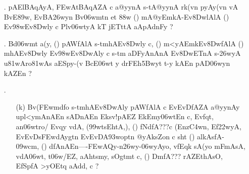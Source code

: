 \def\DevnagVersion{2.15}\documentclass{article}
\begin{document}
\begin{itemize}
\begin{itemize}
                \item[({\dn K}).]{\dn  Ev\398wEv\38DwAly\? pAWcmAnAnA\2 s\2-tAEtEr\3C4wAnA\2 EvqyAZA\2 \322w\?/ Evfoq\? s\2-tm\306wT\4, updFtA, \3FEw(y\2fA, t\?\2 t\?qA\2 EvqyAZA\2 pAWn{\rs -\re}\387wm\? rk(v\?n Env\?fAnFyA,{\rs ,\re} yTA{\rs ----\re}s\2-tkA\326wynAVkAl\2kAr{\rs -\re}fA-/AZA aAi`lsAEh(ypAWn\387wm\? Env\?fn BArtFygEZtAv\?{\qvb}d\?{\rs -\re}d\?s\0nDm\0fA{\rs ???\re}EdnA iEthAs-y c t\? t\? Evqy\? yTAs\2zy\2 Env\?fni(T\2 k\?cn cyE`t {\rs !\re} tA etA\2 cnA a\306wtr\?Z Ek\2 Bv\306wtA, \5, {\rs ?\re}}
              \end{itemize}
              
 \item[{\dn\dnnum \rn{15}}.]  {\dn pAElBAqAyA, \3FEwAtBAqAZA\2 c a@yynA\2 s\2-tA@yynA\2 rk(v\?n pyA\0y(v\?n vA BvE\389w, EvBA\326wyn Bv\306wmt\?n et\? \388w\? {\rs (\re}{\dn\dnnum {}}{\rs )\re} mA@yEmkA{\rs -\re}Ev\38DwlAlA {\rs (\re}{\dn \dnnum {}}{\rs )\re} Ev\398wEv\38Dwly\? c Plv\306wtyA kT\2 jETttA\2 aApAdnFy\? {\rs ?\re}} 
 
 \item[{\dn\dnnum \rn{16}}.] {\dn Bd\306wmt a(y{\rs ,\re} {\rs (\re}{\dn \dnnum {}}{\rs )\re} pAWfAlA s\2-tmhAEv\38Dwly\? c{\rs ,\re} {\rs (\re}{\dn \dnnum {}}{\rs )\re} m<yAEmkEv\38DwfAlA {\rs (\re}{\dn\dnnum {}}{\rs )\re} mhAEv\38Dwly\? Ev\398wEv\38DwAly\? c s\2-tm aDFyAnAnA\2 Ev\38DwET\0nA\2 s\2-\326wyA u\381wAro\381wAs aESpy-(v\2 BcE\306wt y drFEh\35Bwyt\?{\rs ,\re} t-y kAEn pAD\306wy\?n kAZ\0En {\rs ?\re} }
 
 \item[{\dn \dnnum \rn{17}}.]
 \begin{itemize}
 \item[({\dn k})]{\dn Bv(\3FEwmd\?fo s\2-tmhAEv\38DwAly\? pAWfAlA c EvEvDfAZA a@yynAy\0 upl<ymAnAEn sADnAEn Ek\2sv!pAEZ EkEm\2y\306wtEn c{\rs ,\re} Evf\?qt, an\306wtro/\? Evqy\? v\?dA, {\rs (\re}\399w\4tsEhtA,{\rs ),\re} {\rs (\re}{\dn \dnnum {}}{\rs )\re} fNdfA{\rs ???\re}c {\rs (\re}Enz\3C4w\?n{\rs ,\re} Ef\322wyA{\rs ,\re} EvEvDs\2\3FEwdAygt\?n EvEvDA\393wop\?t\?n @yAksZon c sht {\rs (\re}{\dn \dnnum {}}{\rs )\re} al\2kAsfA-\309wcm{\rs ,\re} {\rs (\re}{\dn \dnnum {}}{\rs )\re} dfA\0nAEn{\rs ----\re}\3FEwAQy{\rs -\re}n\326wy{\rs -\re}\306wyAyo{\rs ,\re} v\4f\?Eqk sA(yo mFmA\2sA{\rs ,\re} v\?dA\306wt, t\306w/EZ{\rs ,\re} aAh\0tsmy, sOgtmt\2 c{\rs ,\re} {\rs (\re}{\dn\dnnum {}}{\rs )\re} Dm\0fA{\rs ???\re} rAZ\?EthAsO{\rs ,\re} EfSpfA >yOEtq aAd\4d, c {\rs ?\re}} 
 

\end{itemize}
\end{itemize}
\end{document}
